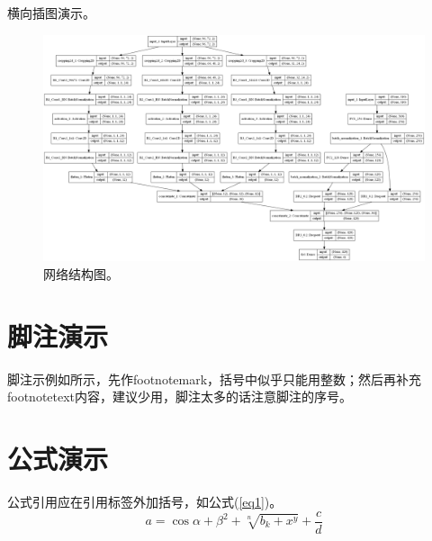 \documentclass[unicode,pdfcover]{scutthesis}
\begin{document}
横向插图演示。
\begin{landscape}
\begin{figure}[htp]
  \centering
  \includegraphics[width=0.8\columnwidth,keepaspectratio]{figure/FIG2-5}
  \caption{网络结构图。}
  \label{FIG-5}
\end{figure}
\end{landscape}

\section{脚注演示}
脚注示例如\footnotemark[1]所示，先作footnotemark，括号中似乎只能用整数；然后再补充footnotetext内容，建议少用，脚注太多的话注意脚注的序号。


\section{公式演示}
公式引用应在引用标签外加括号，如公式(\ref{eq1})。
\begin{equation}\label{eq1}
  a=\cos\alpha+\beta^{2}+\sqrt[n]{b_{k}+x^{y}}+\frac{c}{d}
\end{equation}
\end{document}
